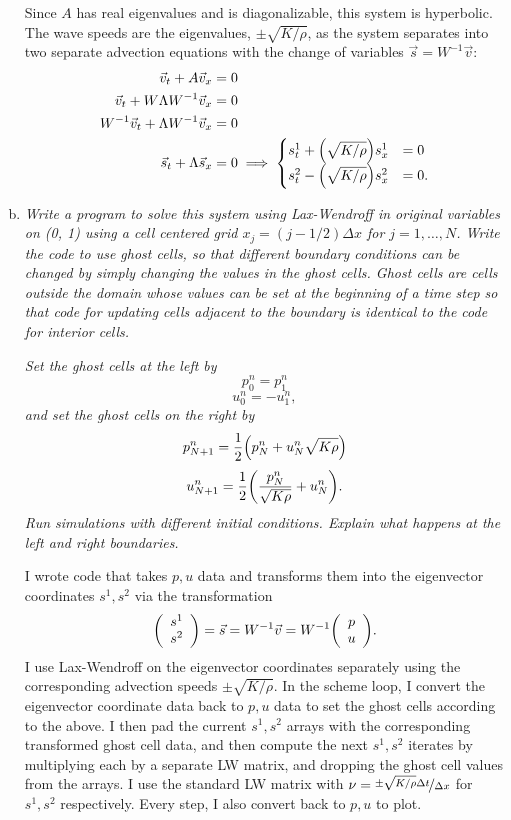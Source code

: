 \documentclass[12pt]{article}
\begin{document}
\begin{enumerate}[(a)]
Since $A$ has real eigenvalues and is diagonalizable, this system is hyperbolic.  The wave speeds are the eigenvalues, $\pm\sqrt{K/\rho}$, as the system separates into two separate advection equations with the change of variables $\vec{s} = W^{-1}\vec{v}:$
\begin{align*}
\vec{v}_t + A \vec{v}_x &= 0 \\
 \vec{v}_t + W\Lambda W^{-1} \vec{v}_x &= 0 \\
 W^{-1}\vec{v}_t + \Lambda W^{-1} \vec{v}_x &= 0 \\
\vec{s}_t + \Lambda \vec{s}_x &= 0 \implies
\begin{cases}
s^1_t + \qty(\sqrt{K/\rho}) s^1_x &= 0 \\ 
s^2_t - \qty(\sqrt{K/\rho})s^2_x &= 0.\end{cases}\end{align*}
\item \emph{Write a program to solve this system using Lax-Wendroff in original variables on (0, 1) using a cell centered grid $x_j = (j - 1/2)\Delta x $ for $j = 1,\dots, N$. Write the code to use ghost cells, so that different boundary conditions can be changed by simply changing the values in the ghost cells. Ghost cells are cells outside the domain whose values can be set at the beginning of a time step so that code for updating cells adjacent to the boundary is identical to the code for interior cells.}

\emph{Set the ghost cells at the left by }
$$p_0^n = p_1^n $$
$$u_0^n = -u_1^n,$$
\emph{and set the ghost cells on the right by}
$$p_{N+1}^n = \frac{1}{2}\qty(p_N^n + u_N^n \sqrt{K\rho})$$
$$u_{N+1}^n = \frac{1}{2} \qty(\dfrac{p_N^n}{\sqrt{K\rho}} + u_N^n). $$
\emph{Run simulations with different initial conditions. Explain what happens at the left and right boundaries.}

I wrote code that takes $p,u$ data and transforms them into the eigenvector coordinates $s^1, s^2$ via the transformation 
$$\qty(\begin{array}{c} s^1 \\ s^2 \end{array}) = \vec{s} = W^{-1}\vec{v} = W^{-1} \qty(\begin{array}{c} p \\ u \end{array}).$$  
I use Lax-Wendroff on the eigenvector coordinates separately using the corresponding advection speeds $\pm\sqrt{K/\rho}$.  In the scheme loop, I convert the eigenvector coordinate data back to $p,u$ data to set the ghost cells according to the above.  I then pad the current $s^1, s^2$ arrays with the corresponding transformed ghost cell data, and then compute the next $s^1, s^2$ iterates by multiplying each by a separate LW matrix, and dropping the ghost cell values from the arrays.  I use the standard LW matrix with $\nu = \nicefrac{\pm\sqrt{K/\rho} \Delta t}{\Delta x}$ for $s^1, s^2$ respectively. Every step, I also convert back to $p,u$ to plot.


\end{enumerate}
\end{document}
